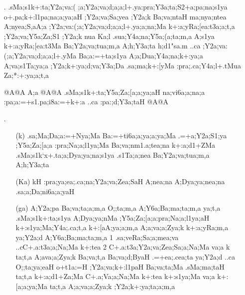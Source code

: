 \begin{spacing}{1.15}
\begin{itemize}
\begin{itemize}
    \end{itemize}
 
 \item[{\sktf 9}.] {\sktf .sMa;s1k+:ta\ZF{-};Y2a;va:(%
;a;Y2a;va;d;a;a;l+.ya\ZF{-}:pra;Y3a;ta;S2+a;pa;na;s1ya
o+.pa;k+:l1pa;na;a;ya;aH ;Y2a;va;Sa;yea ;Y2a;k
Ba;va;ntaH ma;nya;ntea  A;nyea;S,aA;a ;Y2a;va:(;a;Y2a;va;d;a;a;l+.ya;a;na;Ma
k+:a;yRa;[ea:t3a;a;t,a ;Y2a;va;Y5a;Za;S1 ;Y2a;k nua
Ka;l .sua;Y4a;na;Y5a;(a;ta;m,a A;s1ya k+:a;yRa;[ea:t3Ma
Ba;Y2a;va;tua;m,a A;h;Y3a;ta  h;d1}{\sktf "sa.m} {\sktf ..ca ;Y2a;va:(;a;Y2a;va;d;a;a;l+.yMa
Ba;a:=+ta;s1ya A;a;Dua;Y4a;na;k+:ya;a A;va;s1Ta;ya;a ;Y2a;k+:ya;d;va;Y3a;Da
.sa;ma;k+:[yMa :pra;.ca;Y4a;l+.tMua Za;*:+:ya;a;t,a } 
   
 {\sktb {}@A@A A;a @A@A .sMa;s1k+:ta;Y5a;Za;[a;a;ya;aH na;vi6a;a;na;a
:pa;a:=+s1.pa;i8a:=+k+:a ..ca :pa:;d;Y3a;taH%
 @A@A}


\item[{\sktf 10 }.] \begin{itemize}
   \item[({\sktf k})] {\sktf .sa;Ma;Da;a:=+Nya;Ma Ba:=+ti6a;a;ya;a;ya;Ma
.=+a;Y2a;S1;ya ;Y5a;Za;[a;a :pra;Na;a;l1ya;Ma
Ba;va;nm1.a;tea;na k+:a;d1+ZMa .sMa;s1k`x+.ta;a;Dya;ya;na;s1ya .s1Ta;a;nea Ba;Y2a;va;tua;m,a A;h;Y3a;ta
}
            
   \item[({\sktf Ka})] {\sktf kH :pra;ya;ea;.ca;na;Y2a;va;Zea;SaH%
 A;nea;na A;Dya;ya;nea;na .sa;a;Da;ni6a;a;yaH }
            
    \item[({\sktf ga})] {\sktf A;Y2a;pa Ba;va;ta;a;m,a O;;ta;m,a
A;Y6a;Ba;ma;ta;m,a\ZF{,} ya;t,a .sMa;s1k+:ta;s1ya
A;Dya;ya;nMa ;Y5a;Za;[a;a\ZF{-}:pra;Na;a;l1ya;aH k+:s1ya;Ma;Y4a;.ca;t,a
k+:[aA;ya;a;m,a A;a;va;a;Zya;k k+:a;yRa;m,a 
ya;Y2a;d A;Y6a;Ba;ma;ta;m,a\ZF{,} \ZF{(}1\ZF{)} .sa;veRa;Sa;a;mea;va
..cC+.a:t3a;a;Na;Ma k+:tea\ZF{,} \ZF{(}2\ZF{)}
C+.a:t3a;Y2a;va;Zea;Sa;a;Na;Ma va;a k\ZF{,} ta;t,a A;ava;a;Zya;k Ba;va;t,a\ZF{,} Ba;va;d;ByaH
.=+ea;.cea;ta  ya;Y2a;d ..ca O;;ta;ya;eaH o+t1a:=H
;Y2a;va;k+:l1paH Ba;va;ta;Ma .sMa;ma;taH\ZF{,} ta;t,a
k+:a;d1+Za;Ma C+.a;Va;a;Na;Ma k+:tea\ZF{,} k+:s1ya;Ma va;a k+:[a;a;ya;Ma\ZF{,} ta;t,a
A;a;va;a;Zya;k ;Y2a;k+:ya;ta;a;m,a
} 
            

\end{itemize}
\end{itemize}
\end{spacing}
